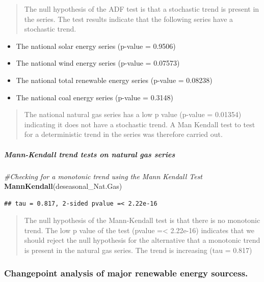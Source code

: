 \documentclass[12pt,]{article}
\newenvironment{Shaded}{\begin{snugshade}}{\end{snugshade}}
\newcommand{\KeywordTok}[1]{\textcolor[rgb]{0.13,0.29,0.53}{\textbf{#1}}}
\newcommand{\CommentTok}[1]{\textcolor[rgb]{0.56,0.35,0.01}{\textit{#1}}}
\newcommand{\NormalTok}[1]{#1}
\providecommand{\tightlist}{%
  \setlength{\itemsep}{0pt}\setlength{\parskip}{0pt}}
\let\oldsubparagraph\subparagraph
\renewcommand{\subparagraph}[1]{\oldsubparagraph{#1}\mbox{}}
\begin{document}
\begin{quote}
The null hypothesis of the ADF test is that a stochastic trend is
present in the series. The test results indicate that the following
series have a stochastic trend.
\end{quote}

\begin{itemize}
\tightlist
\item
  The national solar energy series (p-value = 0.9506)
\item
  The national wind energy series (p-value = 0.07573)
\item
  The national total renewable energy series (p-value = 0.08238)
\item
  The national coal energy series (p-value = 0.3148)
\end{itemize}

\begin{quote}
The national natural gas series has a low p value (p-value = 0.01354)
indicating it does not have a stochastic trend. A Man Kendall test to
test for a deterministic trend in the series was therefore carried out.
\end{quote}

\subparagraph{Mann-Kendall trend tests on natural gas
series}\label{mann-kendall-trend-tests-on-natural-gas-series}

\begin{Shaded}
\begin{Highlighting}[]
\CommentTok{#Checking for a monotonic trend using the Mann Kendall Test}
\KeywordTok{MannKendall}\NormalTok{(deseasonal_Nat.Gas)}
\end{Highlighting}
\end{Shaded}

\begin{verbatim}
## tau = 0.817, 2-sided pvalue =< 2.22e-16
\end{verbatim}

\begin{quote}
The null hypothesis of the Mann-Kendall test is that there is no
monotonic trend. The low p value of the test (pvalue =\textless{}
2.22e-16) indicates that we should reject the null hypothesis for the
alternative that a monotonic trend is present in the natural gas series.
The trend is increasing (tau = 0.817)
\end{quote}

\subsubsection{Changepoint analysis of major renewable energy
sourcess.}\label{changepoint-analysis-of-major-renewable-energy-sourcess.}
\end{document}
